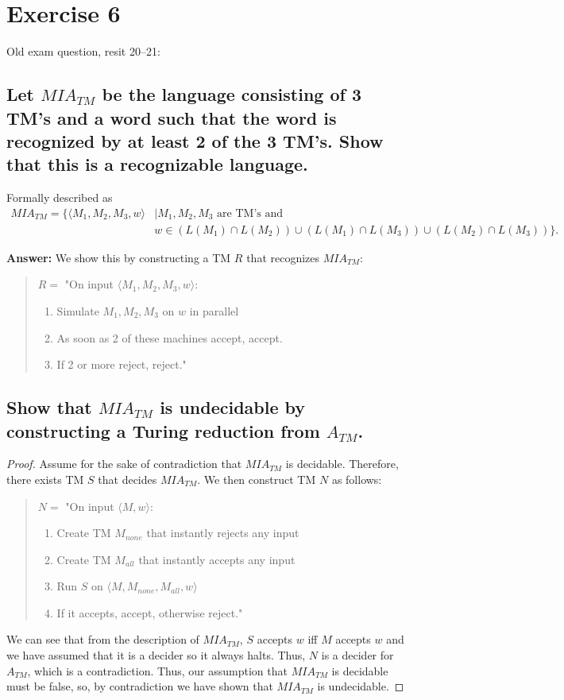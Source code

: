 \documentclass[a4paper,11pt]{article}
\begin{document}
	\section{Exercise 6}
	Old exam question, resit 20--21:

	\subsection{Let $MIA_{TM}$ be the language consisting of 3 TM's and a word such that the word is recognized by at least 2 of the 3 TM's. Show that this is a recognizable language.}
	Formally described as
	\begin{align*}
	MIA_{TM} = \{\langle M_1,M_2,M_3,w \rangle &\mid M_1,M_2,M_3 \text{ are TM's and }\\
	& w \in (L(M_1)\cap L(M_2)) \cup (L(M_1)\cap L(M_3)) \cup (L(M_2)\cap L(M_3)) \}.
	\end{align*}

	\textbf{Answer: }We show this by constructing a TM $R$ that recognizes $MIA_{TM}$:
	\begin{quote}
		$R=$ "On input $\langle M_1,M_2,M_3,w \rangle$:
		\begin{enumerate}
			\item Simulate $M_1,M_2,M_3$ on $w$ in parallel
			\item As soon as 2 of these machines accept, accept.
			\item If 2 or more reject, reject."
		\end{enumerate}
	\end{quote}

	\subsection{Show that $MIA_{TM}$ is undecidable by constructing a Turing reduction from $A_{TM}$.}
	\begin{proof}
		Assume for the sake of contradiction that $MIA_{TM}$ is decidable. Therefore, there exists TM $S$ that decides $MIA_{TM}$. We then construct TM $N$ as follows:
		\begin{quote}
			$N=$ "On input $\langle M,w \rangle$:
			\begin{enumerate}
				\item Create TM $M_{none}$ that instantly rejects any input
				\item Create TM $M_{all}$ that instantly accepts any input
				\item Run $S$ on $\langle M,M_{none},M_{all},w \rangle$
				\item If it accepts, accept, otherwise reject."
			\end{enumerate}
		\end{quote}
		We can see that from the description of $MIA_{TM}$, $S$ accepts $w$ iff $M$ accepts $w$ and we have assumed that it is a decider so it always halts. Thus, $N$ is a decider for $A_{TM}$, which is a contradiction. Thus, our assumption that $MIA_{TM}$ is decidable must be false, so, by contradiction we have shown that $MIA_{TM}$ is undecidable.
	\end{proof}
\end{document}
